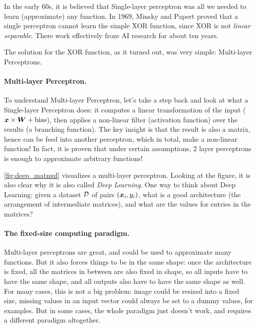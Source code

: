 In the early 60s, it is believed that Single-layer perceptron was all we needed to learn
(approximate) any function. In 1969, Minsky and Papert \cite{perceptrons} proved
that a single perceptron cannot learn the simple XOR function, since XOR is not
\emph{linear separable}. There work effectively froze AI research for about ten years.

The solution for the XOR function, as it turned out, was very simple:
Multi-layer Perceptrons.

\paragraph{Multi-layer Perceptron.} To understand Multi-layer Perceptron, let's
take a step back and look at what a Single-layer Perceptron does: it computes a linear
transformation of the input ($\boldsymbol{x} \times \boldsymbol{W} + \text{bias}$), then
applies a non-linear filter (activation function) over the results (a branching function). The key
insight is that the result is also a matrix, hence can be feed into another
perceptron, which in total, make a non-linear function! In fact, it is proven \cite{universal}
that under certain assumptions, 2 layer perceptrons is enough to approximate arbitrary
functions!

\cref{fig:deep_matmul} visualizes a multi-layer perceptron. Looking at the
figure, it is also clear why it is also called \emph{Deep Learning}. One way to
think about Deep Learning: given a dataset $\mathcal{D}$ of pairs $(\boldsymbol{x}_i, y_i)$, what
is a good architecture (the arrangement of intermediate matrices), and what are
the values for entries in the matrices?

\paragraph{The fixed-size computing paradigm.} Multi-layer perceptrons are
great, and could be used to approximate many functions. But it also forces
things to be in the same shape: once the architecture is fixed, all the matrices
in between are also fixed in shape, so all inputs have to have the same shape,
and all outputs also have to have the same shape as well. For many cases, this
is not a big problem: image could be resized into a fixed size, missing
values in an input vector could always be set to a dummy values, for examples.
But in some cases, the whole paradigm just doesn't work, and requires a
different paradigm altogether. 


